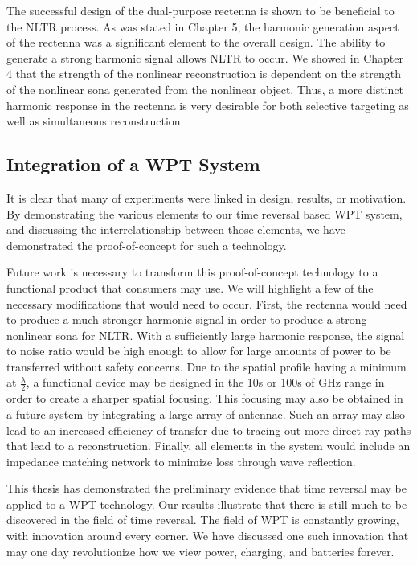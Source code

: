 The successful design of the dual-purpose rectenna is shown to be beneficial to the NLTR process. As was stated in Chapter 5, the harmonic generation aspect of the rectenna was a significant element to the overall design. The ability to generate a strong harmonic signal allows NLTR to occur. We showed in Chapter 4 that the strength of the nonlinear reconstruction is dependent on the strength of the nonlinear sona generated from the nonlinear object. Thus, a more distinct harmonic response in the rectenna is very desirable for both selective targeting as well as simultaneous reconstruction.

\subsection{Integration of a WPT System}

It is clear that many of experiments were linked in design, results, or motivation. By demonstrating the various elements to our time reversal based WPT system, and discussing the interrelationship between those elements, we have demonstrated the proof-of-concept for such a technology. 

Future work is necessary to transform this proof-of-concept technology to a functional product that consumers may use. We will highlight a few of the necessary modifications that would need to occur. First, the rectenna would need to produce a much stronger harmonic signal in order to produce a strong nonlinear sona for NLTR. With a sufficiently large harmonic response, the signal to noise ratio would be high enough to allow for large amounts of power to be transferred without safety concerns. Due to the spatial profile having a minimum at $\frac{\lambda}{2}$, a functional device may be designed in the 10s or 100s of GHz range in order to create a sharper spatial focusing. This focusing may also be obtained in a future system by integrating a large array of antennae. Such an array may also lead to an increased efficiency of transfer due to tracing out more direct ray paths that lead to a reconstruction.  Finally, all elements in the system would include an impedance matching network to minimize loss through wave reflection. 

This thesis has demonstrated the preliminary evidence that time reversal may be applied to a WPT technology. Our results illustrate that there is still much to be discovered in the field of time reversal. The field of WPT is constantly growing, with innovation around every corner. We have discussed one such innovation that may one day revolutionize how we view power, charging, and batteries forever.
